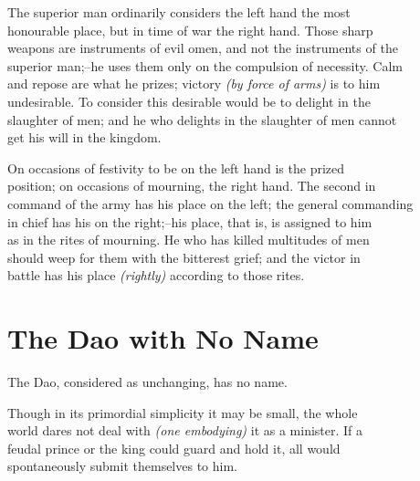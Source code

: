     The superior man ordinarily considers the left hand the most\\
    honourable place, but in time of war the right hand. Those sharp\\
    weapons are instruments of evil omen, and not the instruments of the\\
    superior man;--he uses them only on the compulsion of necessity. Calm\\
    and repose are what he prizes; victory \textit{(by force of arms)} is to him\\
    undesirable. To consider this desirable would be to delight in the\\
    slaughter of men; and he who delights in the slaughter of men cannot\\
    get his will in the kingdom.\vspace{\baselineskip}
    
    On occasions of festivity to be on the left hand is the prized\\
    position; on occasions of mourning, the right hand. The second in\\
    command of the army has his place on the left; the general commanding\\
    in chief has his on the right;--his place, that is, is assigned to him\\
    as in the rites of mourning. He who has killed multitudes of men\\
    should weep for them with the bitterest grief; and the victor in\\
    battle has his place \textit{(rightly)} according to those rites.\vspace{\baselineskip}
    
\section*{The Dao with No Name}
    The Dao, considered as unchanging, has no name.\vspace{\baselineskip}
    
    Though in its primordial simplicity it may be small, the whole\\
    world dares not deal with \textit{(one embodying)} it as a minister. If a\\
    feudal prince or the king could guard and hold it, all would\\
    spontaneously submit themselves to him.\vspace{\baselineskip}\newpage{}
    
